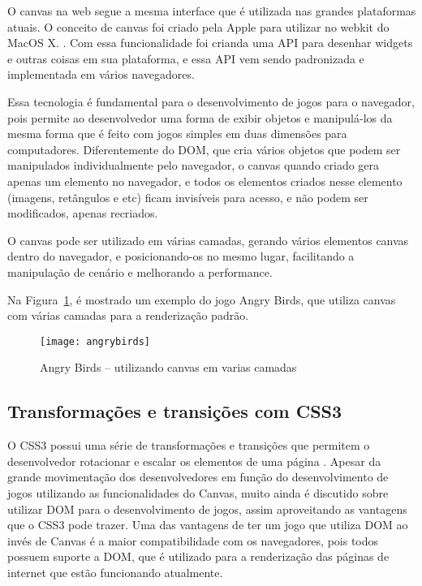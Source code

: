 O canvas na web segue a mesma interface que é utilizada nas grandes
plataformas atuais. O conceito de canvas foi criado pela Apple para
utilizar no webkit do MacOS X. \cite{lubbers2010pro}. Com essa
funcionalidade foi crianda uma API
para desenhar widgets e outras coisas em sua plataforma, e essa API
vem sendo padronizada e implementada em vários navegadores.

Essa tecnologia é fundamental para o desenvolvimento de jogos para
o navegador, pois permite ao desenvolvedor uma forma de exibir
objetos e manipulá-los da mesma forma que é feito com jogos
simples em duas dimensões para computadores.
Diferentemente do DOM, que cria vários objetos que podem ser
manipulados individualmente pelo navegador, o canvas quando criado
gera apenas um elemento no navegador, e todos os elementos criados
nesse elemento (imagens, retângulos e etc) ficam invisíveis para acesso, e
não podem ser modificados, apenas recriados.

O canvas pode ser utilizado em várias camadas, gerando vários
elementos canvas dentro do navegador, e posicionando-os no mesmo
lugar, facilitando a manipulação de cenário e melhorando a
performance.

Na Figura~\ref{img:angrybirds}, é mostrado um exemplo do jogo Angry
Birds, que utiliza canvas com várias camadas para a renderização padrão.

\newlength{\imgwidth}
\setlength{\imgwidth}{16.09cm}
\newlength{\imgheight}
\setlength{\imgheight}{10.59cm}

\begin{figure}[H]
  \centering
	\texttt{[image: angrybirds]}
  \caption{Angry Birds {--} utilizando canvas em varias camadas}
  \label{img:angrybirds}
\end{figure}


\subsection{Transformações e transições com CSS3}

O CSS3 possui uma série de transformações e transições que permitem o
desenvolvedor rotacionar e escalar os elementos de uma página
\cite{agi2011html5}. Apesar da grande movimentação dos desenvolvedores
em função do desenvolvimento de jogos utilizando as funcionalidades do
Canvas, muito ainda é discutido sobre utilizar DOM para o
desenvolvimento de jogos, assim aproveitando as vantagens que o CSS3
pode trazer.
Uma das vantagens de ter um jogo que utiliza DOM ao invés de Canvas é
a maior compatibilidade com os navegadores, pois todos possuem suporte
a DOM, que é utilizado para a renderização das páginas de internet que
estão funcionando atualmente.

